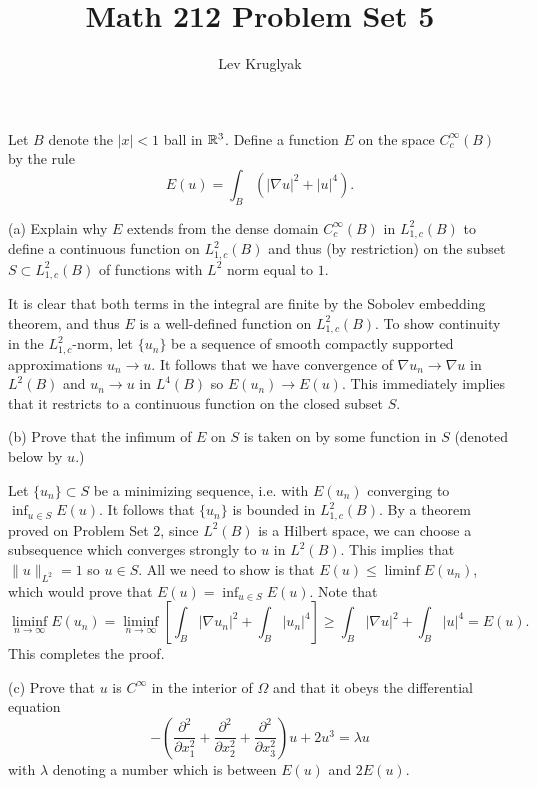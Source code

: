 \documentclass{lkx_pset}
\title{Math 212 Problem Set 5}
\author{Lev Kruglyak}
\begin{document}
\maketitle

\begin{problem}{1}
Let $B$ denote the $|x|<1$ ball in $\mathbb{R}^3$. Define a function $E$ on the space $C^\infty_{c}(B)$ by the rule
\[
	E(u)=\int_B (|\nabla u|^2 + |u|^4).
\]
\end{problem}
\begin{parts}
	\begin{part}{(a)}
		Explain why $E$ extends from the dense domain $C^\infty_c(B)$ in $L^2_{1,c}(B)$ to define a continuous function on $L^2_{1,c}(B)$ and thus (by restriction) on the subset $S\subset L^2_{1,c}(B)$ of functions with $L^2$ norm equal to $1$.
	\end{part}

	It is clear that both terms in the integral are finite by the Sobolev embedding theorem, and thus $E$ is a well-defined function on $L^2_{1,c}(B)$. To show continuity in the $L^2_{1,c}$-norm, let $\{u_n\}$ be a sequence of smooth compactly supported approximations $u_n \to u$. It follows that we have convergence of $\nabla u_n \to \nabla u$ in $L^2(B)$ and $u_n\to u$ in $L^4(B)$ so $E(u_n)\to E(u)$. This immediately implies that it restricts to a continuous function on the closed subset $S$.

	\begin{part}{(b)}
		Prove that the infimum of $E$ on $S$ is taken on by some function in $S$ (denoted below by $u$.)
	\end{part}

	Let $\{u_n\}\subset S$ be a minimizing sequence, i.e. with $E(u_n)$ converging to $\inf_{u\in S}E(u)$. It follows that $\{u_n\}$ is bounded in $L^2_{1,c}(B)$. By a theorem proved on Problem Set 2, since $L^2(B)$ is a Hilbert space, we can choose a subsequence which converges strongly to $u$ in $L^2(B)$. This implies that $\|u\|_{L^2}=1$ so $u\in S$. All we need to show is that $E(u)\leq \liminf E(u_n)$, which would prove that $E(u)=\inf_{u\in S}E(u)$. Note that
	\[
		\liminf_{n\to\infty} E(u_n) = \liminf_{n\to \infty}\left[\int_B |\nabla u_n|^2 + \int_B |u_n|^4\right] \geq \int_B |\nabla u|^2 + \int_B |u|^4 = E(u).
	\]
	This completes the proof.

	\begin{part}{(c)}
		Prove that $u$ is $C^\infty$ in the interior of $\Omega$ and that it obeys the differential equation
		\[
			-\left(\frac{\partial^2}{\partial x_1^2}+\frac{\partial^2}{\partial x_2^2}+\frac{\partial^2}{\partial x_3^2}\right)u+2u^3 = \lambda u
		\]
		with $\lambda$ denoting a number which is between $E(u)$ and $2E(u)$.
	\end{part}


\end{parts}
\end{document}
